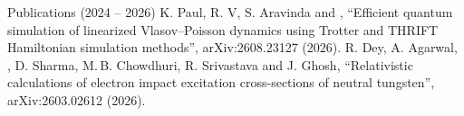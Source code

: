 \begin{rubric}{Publications (2024 -- 2026)}
\entry*[] \small K. Paul, R. V, S. Aravinda and ,
  ``Efficient quantum simulation of linearized Vlasov--Poisson dynamics using Trotter and THRIFT Hamiltonian simulation methods'',
  arXiv:2608.23127 (2026). 
\entry*[] \small R. Dey, A. Agarwal, , D. Sharma, M.\,B. Chowdhuri, R. Srivastava and J. Ghosh,
  ``Relativistic calculations of electron impact excitation cross-sections of neutral tungsten'',
  arXiv:2603.02612 (2026). 


\end{rubric}
